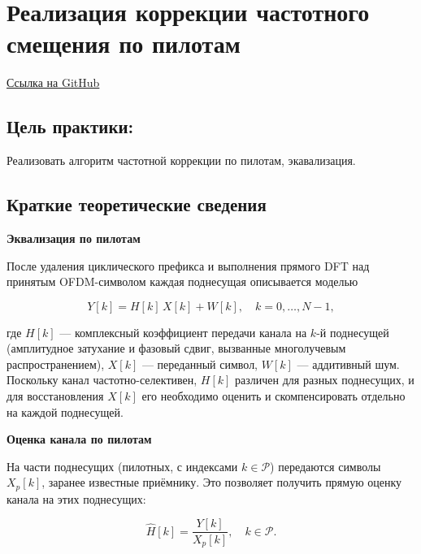 \chapter[Реализация коррекции частотного смещения по пилотам]{Реализация коррекции частотного смещения по пилотам}

\begin{leftbar}
    \href{https://github.com/someotb/sdr}{Ссылка на GitHub}
\end{leftbar}

\section*{Цель практики:}
Реализовать алгоритм частотной коррекции по пилотам, экавализация.

\section*{Краткие теоретические сведения}

\textbf{Эквализация по пилотам}\newline

После удаления циклического префикса и выполнения прямого DFT над
принятым OFDM-символом каждая поднесущая описывается моделью

\begin{equation}
    Y[k] = H[k]\,X[k] + W[k], \quad k = 0,\dots,N-1,
    \label{eq:channel_model}
\end{equation}

где $H[k]$ — комплексный коэффициент передачи канала на $k$-й поднесущей
(амплитудное затухание и фазовый сдвиг, вызванные многолучевым
распространением), $X[k]$ — переданный символ, $W[k]$ — аддитивный шум.
Поскольку канал частотно-селективен, $H[k]$ различен для разных
поднесущих, и для восстановления $X[k]$ его необходимо оценить и
скомпенсировать отдельно на каждой поднесущей.

\vspace{20pt}

\textbf{Оценка канала по пилотам}\newline

На части поднесущих (пилотных, с индексами $k \in \mathcal{P}$)
передаются символы $X_p[k]$, заранее известные приёмнику. Это позволяет
получить прямую оценку канала на этих поднесущих:

\begin{equation}
    \hat{H}[k] = \frac{Y[k]}{X_p[k]}, \quad k \in \mathcal{P}.
\end{equation}

